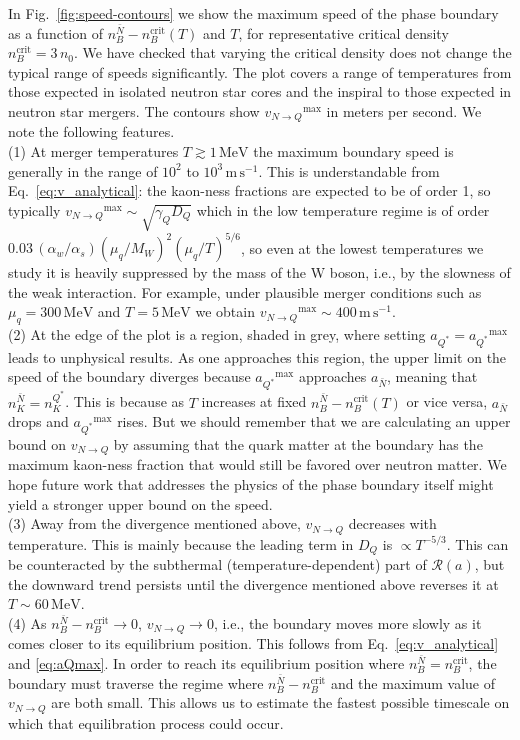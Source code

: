 \documentclass[10pt,superscriptaddress,
amsmath,aps,prl,twocolumn,nofootinbib]{revtex4-1}
\newcommand{\mgacom}[1]{\textsf{\color[rgb]{0.6,0,0}[\textsuperscript{MGA} #1]}}
\newcommand{\AH}[1]{{\color{cyan}#1}}
\newcommand{\JScom}[1]{\textsf{\color{violet} [\textsuperscript{JS}#1]}}
\newcommand{\m}{\text{m}}
\newcommand{\s}{\text{s}}
\newcommand{\MeV}{\text{MeV}}
\newcommand{\nsat}{\ensuremath{n_{0}}}
\newcommand{\aQstar}{\ensuremath{a_{Q^*}}}
\newcommand{\vb}{\ensuremath{v_{N\to Q}}}
\newcommand{\Nbar}{{\ensuremath{\bar N}}}
\begin{document}
In Fig.~\ref{fig:speed-contours} we show the 
maximum speed of the phase boundary as a function of $n_B^\Nbar-n_B^\text{crit}(T)$ and $T$, for representative critical density 
$n_B^\text{crit}=3\,\nsat$. We have checked that varying the critical density does not change the typical range of speeds significantly. The plot
covers a range of temperatures from those expected in isolated neutron star cores \AH{and the inspiral} to those expected in neutron star mergers. The contours show $\vb^\text{max}$ in meters per second.  We note the following features.\\
(1) At merger temperatures $T\gtrsim 1\,\MeV$ the maximum boundary speed is generally in the range of
$10^2$ to $10^3 \,\m\,\s^{-1}$. This is understandable from Eq.~\eqref{eq:v_analytical}: the kaon-ness fractions
are expected to be of order 1, so typically $\vb^\text{max}\sim \sqrt{\gamma_Q D_Q}$ which in the low temperature regime is of order $0.03\,(\alpha_w/\alpha_s) (\mu_q/M_W)^2(\mu_q/T)^{5/6}$, so even at the lowest temperatures we study it is heavily suppressed by the mass of the W boson, i.e., by the slowness of the weak interaction. 
For example, under plausible merger conditions such as $\mu_q=300\,\MeV$ and $T = 5\,\MeV$ we obtain  $\vb^\text{max} \sim 400\,\m\,\s^{-1}$. %
\\
%
(2) At the edge of the plot is a region, shaded in grey, where setting $\aQstar=\aQstar^\text{max}$ leads to unphysical results. As one approaches this region, the upper limit on the speed of the boundary diverges because $\aQstar^\text{max}$ approaches $a_\Nbar$, meaning that $n_K^\Nbar = n_K^{Q^*}$. This is because as $T$ increases at fixed $n_B^\Nbar-n_B^\text{crit}(T)$ or vice versa, $a_\Nbar$ drops and $\aQstar^\text{max}$ rises. But we should remember that we are calculating an upper bound on $\vb$ by assuming that the quark matter at the boundary has the maximum kaon-ness fraction that would still be favored over neutron matter. We hope future work that addresses the physics of the phase boundary itself might yield a stronger upper bound on the speed.\\
%
(3) Away from the divergence mentioned above, $\vb$ decreases with temperature. This is mainly because the leading term in $D_Q$ is $\propto T^{-5/3}$. This can be counteracted by the
subthermal (temperature-dependent) part of $\mathcal{R}(a)$, but
the downward trend persists until the divergence mentioned above
reverses it at $T\sim 60\,\MeV$.\\
%
(4) As $n_B^\Nbar - n_B^\text{crit}\to 0$, $\vb\to 0$, i.e., the boundary moves more slowly as it comes closer to its equilibrium position. This follows from Eq.~\eqref{eq:v_analytical} and \eqref{eq:aQmax}.
In order to reach its equilibrium position where $n_B^\Nbar=n_B^\text{crit}$, the boundary must traverse the regime where $n_B^\Nbar-n_B^\text{crit}$ and the maximum value of $\vb$ are both small. This allows us to estimate the fastest possible timescale on which that equilibration process could occur.
\end{document}
